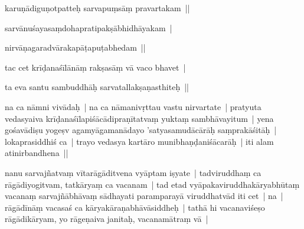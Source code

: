 \documentclass[article,12pt,a4paper]{memoir}%
\newcounter{parCount}
\begin{document}
	  
	  \pstart \leavevmode%
	karuṇādiguṇotpatteḥ sarvapuṃsāṃ pravartakam || 
	{}
	\pend%
      

	  
	  \pstart \leavevmode%
	sarvānuśayasaṃdohapratipakṣābhidhāyakam | 
	{}
	\pend%
      

	  
	  \pstart \leavevmode%
	nirvāṇagaradvārakapāṭapuṭabhedam || 
	{}
	\pend%
      

	  
	  \pstart \leavevmode%
	tac cet krīḍanaśīlānāṃ rakṣasāṃ vā vaco bhavet | 
	{}
	\pend%
      

	  
	  \pstart \leavevmode%
	ta eva santu sambuddhāḥ sarvatallakṣaṇasthiteḥ || 
	{}
	\pend%
      

	  
	  \pstart \leavevmode%
	\label{thakur75-26.3}na ca nāmni vivādaḥ | na ca nāmanivṛttau vastu nirvartate | pratyuta vedasyaiva krīḍanaśīlapiśācādipraṇītatvaṃ yuktaṃ sambhāvayitum | yena gośavādiṣu yogeṣv agamyāgamanādayo 'satyasamudācārāḥ saṃprakāśitāḥ | lokaprasiddhiś ca | trayo vedasya kartāro munibhaṇḍaniśācarāḥ | iti alam atinirbandhena || 
	{}
	\pend%
      

	  
	  \pstart \leavevmode%
	\label{thakur75-26.9}nanu sarvajñatvaṃ vītarāgāditvena vyāptam iṣyate | tadviruddhaṃ ca rāgādiyogitvam, tatkāryaṃ ca vacanam | tad etad vyāpakaviruddhakāryabhūtaṃ vacanaṃ sarvajñābhāvaṃ sādhayati paramparayā viruddhatvād iti cet | na | rāgādīnāṃ vacasaś ca kāryakāraṇabhāvāsiddheḥ | tathā hi vacanaviśeṣo rāgādikāryam, yo rāgeṇaiva janitaḥ, vacanamātraṃ vā | 
	{}
	\pend%
      
\end{document}

